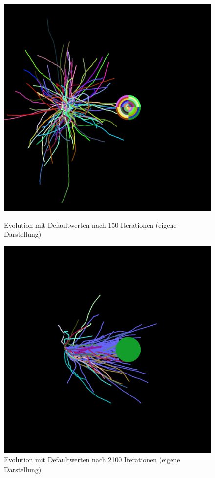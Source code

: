 \documentclass[../mciAusarbeitung.tex]{subfiles}
\begin{document}
		\begin{figure}[H]
			\begin{minipage}[t]{0.45\linewidth} 
				\includegraphics[width=\linewidth]{img/evoDefault.png}
				\caption[EvoDefault]{Evolution mit Defaultwerten nach 150 Iterationen (eigene Darstellung)}
			\end{minipage}
		\hfill
			\begin{minipage}[t]{0.45\linewidth} 
				\includegraphics[width=\linewidth]{img/evoDefaultEnd.png}
				\caption[EvoDefaultEnd]{Evolution mit Defaultwerten nach 2100 Iterationen (eigene Darstellung)}
			\end{minipage}
		\end{figure} 
\end{document}
